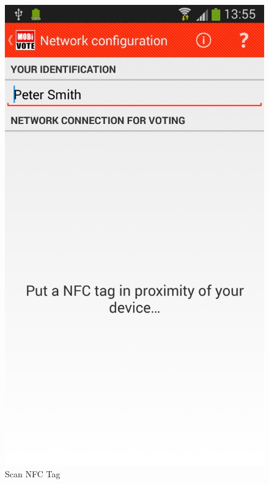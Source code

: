 \documentclass[numbers=noenddot, abstract=on, a4paper, headsepline,
footsepline, oneside, draft=off]{scrreprt}
\begin{document}
\begin{figure}[!htb]
\begin{minipage}{.5\textwidth}
		\includegraphics[height=.4\textheight]{img/screenshots/scan_nfc_tag}
		\caption{Scan NFC Tag}
		\label{fig:handbook_scannfctag}
	\end{minipage}
\end{figure}
\end{document}
